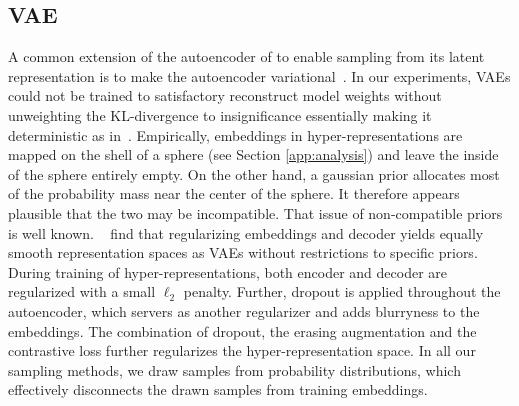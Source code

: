 \subsection{VAE}
A common extension of the autoencoder of \citep{schurholtSelfSupervisedRepresentationLearning2021} to enable sampling from its latent representation is to make the autoencoder variational~\citep{kingmaAutoEncodingVariationalBayes2013}.
In our experiments, VAEs could not be trained to satisfactory reconstruct model weights without unweighting the KL-divergence to insignificance essentially making it deterministic as in~\citep{schurholtSelfSupervisedRepresentationLearning2021}. 
Empirically, embeddings in hyper-representations are mapped on the shell of a sphere (see Section \ref{app:analysis}) and leave the inside of the sphere entirely empty. 
On the other hand, a gaussian prior allocates most of the probability mass near the center of the sphere. 
It therefore appears plausible that the two may be incompatible.
That issue of non-compatible priors is well known.%
~\citep{ghoshVariationalDeterministicAutoencoders2020} find that regularizing embeddings and decoder yields equally smooth representation spaces as VAEs without restrictions to specific priors.
During training of hyper-representations, both encoder and decoder are regularized with a small $\ell_2$ penalty. Further, dropout is applied throughout the autoencoder, which servers as another regularizer and adds blurryness to the embeddings. The combination of dropout, the erasing augmentation and the contrastive loss further regularizes the hyper-representation space. 
In all our sampling methods, we draw samples from probability distributions, which effectively disconnects the drawn samples from training embeddings.

